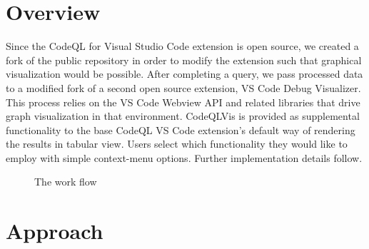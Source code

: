 \documentclass[sigplan,10pt,review]{acmart}
\begin{document}
\section{Overview}
Since the CodeQL for Visual Studio Code extension is open source, we created a fork of the public repository in order to modify the extension such that graphical visualization would be possible. After completing a query, we pass processed data to a modified fork of a second open source extension, VS Code Debug Visualizer. This process relies on the VS Code Webview API and related libraries that drive graph visualization in that environment.
\newline
\indent CodeQLVis is provided as supplemental functionality to the base CodeQL VS Code extension's default way of rendering the results in tabular view. Users select which functionality they would like to employ with simple context-menu options. Further implementation details follow.

\begin{figure}[H]
  \centering
  \caption{The work flow}
\end{figure}

\section{Approach}
\end{document}

